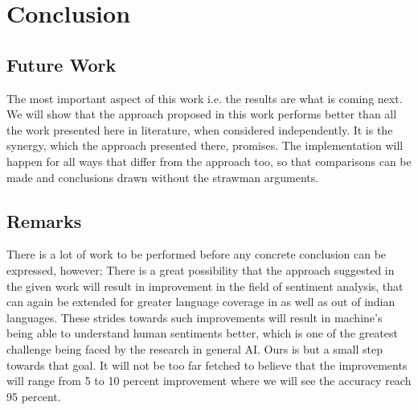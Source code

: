 \documentclass[12pt]{book}
\begin{document}
\chapter{Conclusion}

\section{Future Work}
The most important aspect of this work i.e. the results are what is coming
next. We will show that the approach proposed in this work performs better than
all the work presented here in literature, when considered independently. It is
the synergy, which the approach presented there, promises. The implementation
will happen for all ways that differ from the approach too, so that comparisons
can be made and conclusions drawn without the strawman arguments. 

\section{Remarks}
There is a lot of work to be performed before any concrete conclusion can be
expressed, however; There is a great possibility that the approach suggested in
the given work will result in improvement in the field of sentiment analysis,
that can again be extended for greater language coverage in as well as out of
indian languages. These strides towards such improvements will result in
machine's being able to understand human sentiments better, which is one of the
greatest challenge being faced by the research in general AI. Ours is but a
small step towards that goal. It will not be too far fetched to believe that
the improvements will range from 5 to 10 percent improvement where we will see
the accuracy reach 95 percent. \\



\printbibliography
\end{document}
